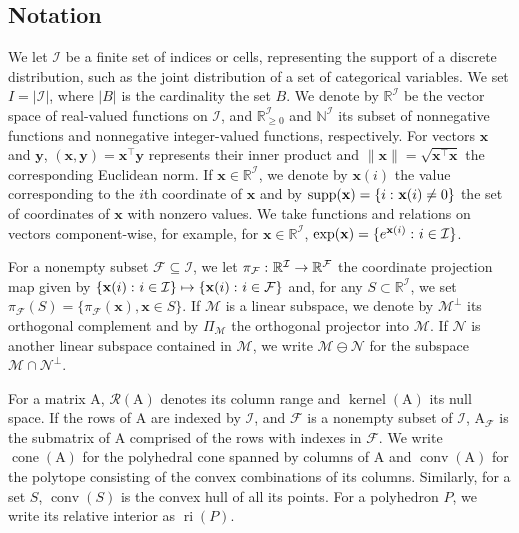 \documentclass[aos,MSNbibl,nameyear,dvips]{arximspdf}
\newcommand{\m}[1]{\mathrm{#1}}
\newcommand{\bfx}{\mathbf{x}}
\begin{document}
\subsection*{Notation}

We let $\mathcal{I}$ be a finite set of indices or cells, representing
the support of a discrete distribution, such as the joint distribution
of a set of categorical variables. We set $I = |\mathcal{I}|$, where
$|B|$ is the cardinality the set $B$. We denote by
$\mathbb{R}^{\mathcal{I}}$ be the vector space of real-valued functions
on $\mathcal{I}$, and $\mathbb{R}^{\mathcal{I}}_{\geq0}$ and
$\mathbb{N}^{\mathcal{I}}$ its subset of nonnegative functions and
nonnegative integer-valued functions, respectively. For vectors
$\mathbf{x}$ and $\mathbf{y}$, $(\mathbf{x}, \mathbf{y}) =
\mathbf{x}^\top\mathbf{y} $ represents their inner product and $\|
\mathbf{x}\| = \sqrt{\bfx^\top \bfx}$ the corresponding Euclidean norm.
If $\bfx\in \mathbb{R}^\mathcal{I}$, we denote by $\mathbf{x}(i)$ the
value corresponding to the $i$th coordinate of $\mathbf{x}$ and by
$\operatorname{supp}(\mathbf{x}) = \{ i \dvtx \mathbf{x}(i) \neq0\}$
the set of coordinates of $\mathbf{x}$ with nonzero values. We take
functions and relations on vectors component-wise, for example, for
$\mathbf{x} \in \mathbb{R}^{\mathcal{I}}$, $\exp(\mathbf{x}) = \{
e^{\mathbf{x}(i)} \dvtx  i \in\mathcal{I} \}$.

For a nonempty subset $\mathcal{F} \subseteq\mathcal{I}$, we let
$\pi_\mathcal{F} \dvtx  \mathbb{R}^{\mathcal{I}} \rightarrow
\mathbb{R}^{\mathcal{F}}$ the coordinate projection map given by $ \{
\mathbf{x}(i) \dvtx  i \in\mathcal{I} \} \mapsto\{ \mathbf{x}(i) \dvtx
i \in\mathcal{F} \} $ and, for any $S \subset\mathbb{R}^{\mathcal{I}}$,
we set $\pi_\mathcal{F}(S) = \{ \pi_{\mathcal{F}}(\mathbf{x}),
\mathbf{x} \in S\}$. If $\mathcal{M}$ is a linear subspace, we denote
by $\mathcal{M}^\bot$ its orthogonal complement and by
$\Pi_{\mathcal{M}}$ the orthogonal projector into $\mathcal{M}$. If
$\mathcal{N}$ is another linear subspace contained in $\mathcal{M}$, we
write $\mathcal{M} \ominus\mathcal{N}$ for the subspace $\mathcal{M}
\cap \mathcal{N}^\bot$.

For a matrix $\m{A}$, $\mathcal{R}(\m{A})$ denotes its column range and
$\operatorname{kernel}(\m{A})$ its null space. If the rows of $\m{A}$
are indexed by $\mathcal{I}$, and $\mathcal{F}$ is a nonempty subset of
$\mathcal{I}$, $\m{A}_{\mathcal{F}}$ is the submatrix of $\m{A}$
comprised of the rows with indexes in $\mathcal{F}$. We write
$\operatorname{cone}(\m{A})$ for the polyhedral cone spanned by columns
of $\m{A}$ and $\operatorname{conv}(\m{A})$ for the polytope consisting of the
convex combinations of its columns. Similarly, for a set $S$,
$\operatorname{conv}(S)$ is the convex hull of all its points. For a
polyhedron $P$, we write its relative interior as
$\operatorname{ri}(P)$.
\end{document}
